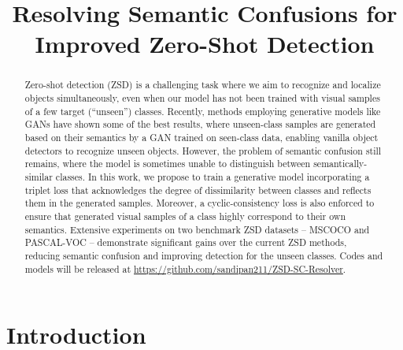 \documentclass{bmvc2k}
\title{Resolving Semantic Confusions for Improved Zero-Shot Detection}
\begin{document}
\maketitle

\begin{abstract}
Zero-shot detection (ZSD) is a challenging task where we aim to recognize and localize objects simultaneously, even when our model has not been trained with visual samples of a few target (``unseen'') classes. Recently, methods employing generative models like GANs have shown some of the best results, where unseen-class samples are generated based on their semantics by a GAN trained on seen-class data, enabling vanilla object detectors to recognize unseen objects. However, the problem of semantic confusion still remains, where the model is sometimes unable to distinguish between semantically-similar classes. In this work, we propose to train a generative model incorporating a triplet loss that acknowledges the degree of dissimilarity between classes and reflects them in the generated samples. Moreover, a cyclic-consistency loss is also enforced to ensure that generated visual samples of a class highly correspond to their own semantics. Extensive experiments on two benchmark ZSD datasets -- MSCOCO and PASCAL-VOC -- demonstrate significant gains over the current ZSD methods, reducing semantic confusion and improving detection for the unseen classes. Codes and models will be released at \url{https://github.com/sandipan211/ZSD-SC-Resolver}.
\end{abstract}

\section{Introduction}
\label{sec:intro}
\end{document}
